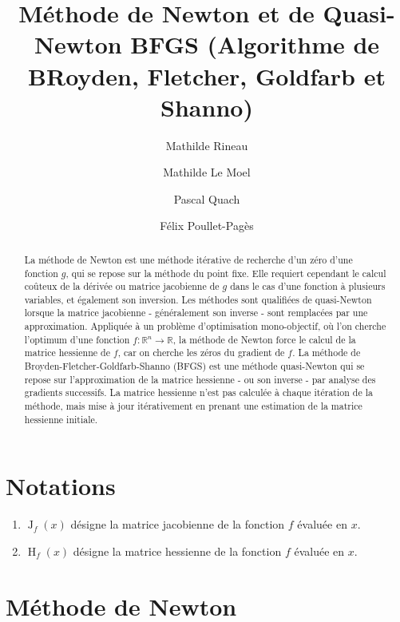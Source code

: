 \documentclass[3p, twocolumn]{elsarticle}
\DeclareMathOperator{\Hessian}{H}
\DeclareMathOperator{\Jacobian}{J}
\begin{document}
\nocite{arxiv:kovalev2019stochastic}
\begin{frontmatter}
    \title{Méthode de Newton et de Quasi-Newton BFGS (Algorithme de BRoyden, Fletcher, Goldfarb et Shanno)}
    \author{Mathilde Rineau}
    \author{Mathilde Le Moel}
    \author{Pascal Quach}
    \author{Félix Poullet-Pagès}

    \begin{abstract}
        La méthode de Newton est une méthode itérative de recherche d'un zéro d'une fonction $g$, qui se repose sur la méthode du point fixe. Elle requiert cependant le calcul coûteux de la dérivée ou matrice jacobienne de $g$ dans le cas d'une fonction à plusieurs variables, et également son inversion. Les méthodes sont qualifiées de quasi-Newton lorsque la matrice jacobienne - généralement son inverse - sont remplacées par une approximation. Appliquée à un problème d'optimisation mono-objectif, où l'on cherche l'optimum d'une fonction $f:\mathbb{R}^n\rightarrow \mathbb{R}$, la méthode de Newton force le calcul de la matrice hessienne de $f$, car on cherche les zéros du gradient de $f$. La méthode de Broyden-Fletcher-Goldfarb-Shanno (BFGS) est une méthode quasi-Newton qui se repose sur l'approximation de la matrice hessienne - ou son inverse - par analyse des gradients successifs. La matrice hessienne n'est pas calculée à chaque itération de la méthode, mais mise à jour itérativement en prenant une estimation de la matrice hessienne initiale.
    \end{abstract}
\end{frontmatter}

\cleardoublepage
\tableofcontents

\cleardoublepage
\section{Notations}
\begin{enumerate}
    \item $\Jacobian_{f}(x)$ désigne la matrice jacobienne de la fonction $f$ évaluée en $x$.
    \item $\Hessian_{f}(x)$ désigne la matrice hessienne de la fonction $f$ évaluée en $x$.
\end{enumerate}
\section{Méthode de Newton}
\end{document}
